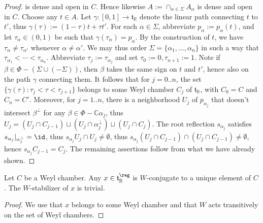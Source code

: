 \documentclass[reqno]{amsart} 
\begin{document}
\begin{proof}
  is dense and open in $C$.  Hence likewise $A := \cap_{\alpha \in \Sigma} A_\alpha$ is dense and open in $C$.  Choose any $t \in A$.  Let $\gamma : [0,1] \rightarrow \mathfrak{t}_{\mathbb{R}}$ denote the linear path connecting $t$ to $t'$, thus $\gamma(\tau) := (1 - \tau) t + \tau t'$.  For each $\alpha \in \Sigma$, abbreviate $p_\alpha := p_\alpha(t)$, and let $\tau_{\alpha} \in (0,1)$ be such that $\gamma(\tau_\alpha) = p_\alpha$.  By the construction of $t$, we have $\tau_\alpha \neq \tau_{\alpha '}$ whenever $\alpha \neq \alpha '$.  We may thus order $\Sigma = \{\alpha_1, \dotsc, \alpha_n\}$ in such a way that $\tau_{\alpha_1} < \dotsb < \tau_{\alpha_n}$.  Abbreviate $\tau_j := \tau_{\alpha_j}$ and set $\tau_0 := 0, \tau_{n+1} := 1$.  Note if $\beta \in \Phi - (\Sigma \cup (- \Sigma))$, then $\beta$ takes the same sign on $t$ and $t'$, hence also on the path $\gamma$ connecting them.  It follows that for $j=0..n$, the set $\{\gamma(\tau) : \tau_{j} < \tau < \tau_{j+1}\}$ belongs to some Weyl chamber $C_j$ of $\mathfrak{t}_{\mathbb{R}}$, with $C_0 = C$ and $C_n = C'$.  Moreover, for $j=1..n$, there is a neighborhood $U_j$ of $p_{\alpha_j}$ that doesn't intersect $\beta^\perp$ for any $\beta \in \Phi - \mathbb{C} \alpha_j$, thus $U_j = (U_j \cap C_{j-1}) \sqcup (U_j \cap \alpha_j^\perp) \sqcup (U_j \cap C_j)$.  The root reflection $s_{\alpha_j}$ satisfies $s_{\alpha_j}|_{\alpha_j^\perp} = \id$, thus $s_{\alpha_j} U_j \cap U_j \neq \emptyset$, thus $s_{\alpha_j} (U_j \cap C_{j-1}) \cap (U_j \cap C_{j-1}) \neq \emptyset$, hence $s_{\alpha_j} C_{j-1} = C_j$.  The remaining assertions follow from what we have already shown.
\end{proof}

\begin{corollary}
  Let $C$ be a Weyl chamber.  Any $x \in \mathfrak{t}_{\mathbb{R}}^{\reg}$ is $W$-conjugate to a unique element of $C$.  The $W$-stabilizer of $x$ is trivial.
\end{corollary}
\begin{proof}
  We use that $x$ belongs to some Weyl chamber and that $W$ acts transitively on the set of Weyl chambers.
\end{proof}
\end{document}
